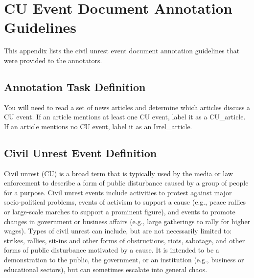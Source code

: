 \chapter{CU Event Document Annotation Guidelines}
\label{Appendix:EventDocumentAnnotationGuidelines}
This appendix lists the civil unrest event document annotation guidelines that were provided
to the annotators.

\section{Annotation Task Definition}

You will need to read a set of news articles and determine which articles discuss a CU event.
If an article mentions at least one CU event, label it as a CU\_article. 
If an article mentions no CU event, label it as an Irrel\_article.\\

\section{Civil Unrest Event Definition}

Civil unrest (CU) is a broad term that is typically used by the media or
law enforcement to describe a form of public disturbance caused by a
group of people for a purpose. Civil unrest events include activities to protest
against major socio-political problems, events of activism to support
a cause (e.g., peace rallies or large-scale marches to support a
prominent figure), and events to promote changes in government or
business affairs (e.g., large gatherings to rally for higher wages).
Types of civil unrest can include, but are not necessarily limited to:
strikes, rallies, sit-ins and other forms of obstructions, riots,
sabotage, and other forms of public disturbance motivated by a
cause. It is intended to be a demonstration to the public, the
government, or an institution (e.g., business or educational sectors),
but can sometimes escalate into general chaos.\\

